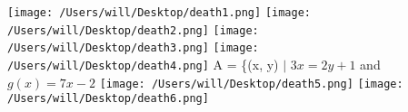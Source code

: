 \documentclass{article}
\begin{document}
\begin{tiny}
\texttt{[image: /Users/will/Desktop/death1.png]}
\texttt{[image: /Users/will/Desktop/death2.png]}
\texttt{[image: /Users/will/Desktop/death3.png]}\newline\newline
\texttt{[image: /Users/will/Desktop/death4.png]}\newline\newline
A = \{(x, y) $\mid$ ${3x=2y+1}$ and ${g(x) = 7x-2}$\newline
\texttt{[image: /Users/will/Desktop/death5.png]}
\texttt{[image: /Users/will/Desktop/death6.png]}





\end{tiny}
\end{document}
